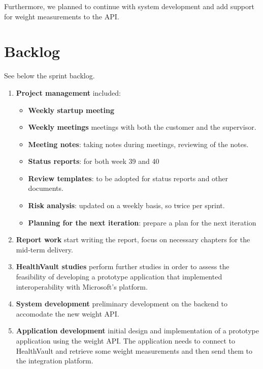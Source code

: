 Furthermore, we planned to continue with system development and add support for weight
measurements to the API.


\section{Backlog}

See below the sprint backlog.
\begin{enumerate}[1.]
	\item \textbf{Project management} included:
	\begin{itemize}
		\item \textbf{Weekly startup meeting}
		\item \textbf{Weekly meetings}
			meetings with both the customer and the supervisor.
		\item \textbf{Meeting notes}:
			taking notes during meetings, reviewing of the notes.
		\item \textbf{Status reports}:
			for both week 39 and 40
		\item \textbf{Review templates}:
			to be adopted for status reports and other documents.
		\item \textbf{Risk analysis}:
			updated on a weekly basis, so twice per sprint.
		\item \textbf{Planning for the next iteration}:
			prepare a plan for the next iteration
	\end{itemize}
	\item \textbf{Report work}\newline
		start writing the report, focus on necessary chapters for the mid-term delivery.
	\item \textbf{HealthVault studies}\newline
		perform further studies in order to assess the feasibility of developing a prototype
		application that implemented interoperability with Microsoft's platform.
	\item \textbf{System development}\newline
		preliminary development on the backend to accomodate the new weight API.
	\item \textbf{Application development}\newline
		initial design and implementation of a prototype application using the weight API.
		The application needs to connect to HealthVault and retrieve some weight measurements
		and then send them to the integration platform.
\end{enumerate}


